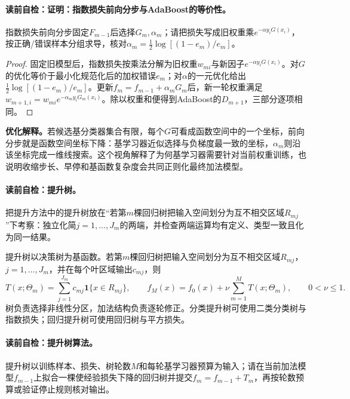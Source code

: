 \paragraph{读前自检：证明：指数损失前向分步与AdaBoost的等价性。}指数损失前向分步固定$F_{m-1}$后选择$G_m,\alpha_m$；请把损失写成旧权重乘$e^{-\alpha y_iG(x_i)}$，按正确/错误样本分组求导，核对$\alpha_m=\tfrac12\log[(1-e_m)/e_m]$。\par

\begin{proof}
固定旧模型后，指数损失按乘法分解为旧权重$w_{mi}$与新因子$e^{-\alpha y_iG(x_i)}$。对$G$的优化等价于最小化规范化后的加权错误$e_m$；对$\alpha$的一元优化给出$\frac12\log[(1-e_m)/e_m]$。更新$f_m=f_{m-1}+\alpha_mG_m$后，新一轮权重满足$w_{m+1,i}=w_{mi}e^{-\alpha_my_iG_m(x_i)}$。除以权重和便得到AdaBoost的$D_{m+1}$，三部分逐项相同。
\end{proof}

\label{struct:V3-C03-CH19}
\textbf{优化解释。}若候选基分类器集合有限，每个$G$可看成函数空间中的一个坐标，前向分步就是函数空间坐标下降：基学习器近似选择与负梯度最一致的坐标，$\alpha_m$则沿该坐标完成一维线搜索。这个视角解释了为何基学习器需要针对当前权重训练，也说明收缩步长、早停和基函数复杂度会共同正则化最终加法模型。


\paragraph{读前自检：提升树。}把提升方法中的提升树放在“若第$m$棵回归树把输入空间划分为互不相交区域$R_{mj}$”下考察：独立化简$j=1,\ldots,J_m$的两端，并检查两端运算均有定义、类型一致且化为同一结果。\par

\label{struct:V3-C03-CH20}
提升树以决策树为基函数。若第$m$棵回归树把输入空间划分为互不相交区域$R_{mj}$，$j=1,\ldots,J_m$，并在每个叶区域输出$c_{mj}$，则
\[
T(x;\Theta_m)=\sum_{j=1}^{J_m}c_{mj}\mathbf{1}\{x\in R_{mj}\},
\qquad
f_M(x)=f_0(x)+\nu\sum_{m=1}^{M}T(x;\Theta_m),\qquad 0<\nu\leq1.
\]
树负责选择非线性分区，加法结构负责逐轮修正。分类提升树可使用二类分类树与指数损失；回归提升树可使用回归树与平方损失。

\paragraph{读前自检：提升树算法。}提升树以训练样本、损失、树轮数$M$和每轮基学习器预算为输入；请在当前加法模型$f_{m-1}$上拟合一棵使经验损失下降的回归树并提交$f_m=f_{m-1}+T_m$，再按轮数预算或验证停止规则核对输出。\par
